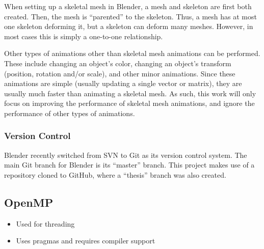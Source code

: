 When setting up a skeletal mesh in Blender, a mesh and skeleton are first both created.
Then, the mesh is ``parented'' to the skeleton.
Thus, a mesh has at most one skeleton deforming it, but a skeleton can deform many meshes.
However, in most cases this is simply a one-to-one relationship.

Other types of animations other than skeletal mesh animations can be performed.
These include changing an object's color, changing an object's transform (position, rotation and/or scale), and other minor animations.
Since these animations are simple (usually updating a single vector or matrix), they are usually much faster than animating a skeletal mesh.
As such, this work will only focus on improving the performance of skeletal mesh animations, and ignore the performance of other types of animations.

\subsubsection{Version Control}

Blender recently switched from SVN\cite{svn} to Git\cite{git} as its version control system\cite{blendergit}.
The main Git branch for Blender is its ``master'' branch.
This project makes use of a repository cloned to GitHub\cite{github}, where a ``thesis'' branch was also created.

\subsection{OpenMP}
\ifsummaries
\begin{itemize}
 \item Used for threading
 \item Uses pragmas and requires compiler support
\end{itemize}
\fi


%
